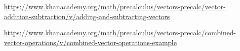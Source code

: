 \begin{readinessAssuranceResources}
\item \url{https://www.khanacademy.org/math/precalculus/vectors-precalc/vector-addition-subtraction/v/adding-and-subtracting-vectors}
\item \url{https://www.khanacademy.org/math/precalculus/vectors-precalc/combined-vector-operations/v/combined-vector-operations-example}
\end{readinessAssuranceResources}
